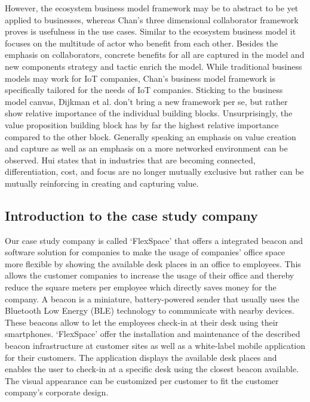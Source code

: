 	However, the ecosystem business model framework may be to abstract to be yet applied to businesses, whereas  Chan's three dimensional collaborator framework proves is usefulness in the use cases. Similar to the ecosystem business model it focuses on the multitude of actor who benefit from each other. Besides the emphasis on collaborators, concrete benefits for all are captured in the model and new components strategy and tactic enrich the model. While traditional business models may work for IoT companies, Chan's  business model framework is specifically tailored for the needs of IoT companies. Sticking to the business model canvas, Dijkman et al. \cite{dijkman} don't bring a new framework per se, but rather show relative importance of the individual building blocks. Unsurprisingly, the value proposition building block has by far the highest relative importance compared to the other block. Generally speaking an emphasis on value creation and capture as well as an emphasis on a more networked environment can be observed. Hui \cite{hui} states that in industries that are becoming connected, differentiation, cost, and focus are no longer mutually exclusive but rather can be mutually reinforcing in creating and capturing value.

	\subsection{Introduction to the case study company}
		Our case study company is called `FlexSpace' that offers a integrated beacon and software solution for companies to make the usage of companies' office space more flexible by showing the available desk places in an office to employees. This allows the customer companies to increase the usage of their office and thereby reduce the square meters per employee which directly saves money for the company. A beacon is a miniature, battery-powered sender that usually uses the Bluetooth Low Energy (BLE) technology to communicate with nearby devices. These beacons allow to let the employees check-in at their desk using their smartphones. `FlexSpace' offer the installation and maintenance of the described beacon infrastructure at customer sites as well as a white-label mobile application for their customers. The application displays the available desk places and enables the user to check-in at a specific desk using the closest beacon available. The visual appearance can be customized per customer to fit the customer company's corporate design.


